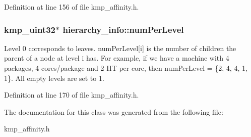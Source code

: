 Definition at line 156 of file kmp\-\_\-affinity.\-h.

\hypertarget{classhierarchy__info_a12fc455d853883d91e3a19567aaac3fe}{
\subsubsection[{num\-Per\-Level}]{\setlength{\rightskip}{0pt plus 5cm}kmp\-\_\-uint32$\ast$ hierarchy\-\_\-info\-::num\-Per\-Level}}\label{classhierarchy__info_a12fc455d853883d91e3a19567aaac3fe}
Level 0 corresponds to leaves. num\-Per\-Level\mbox{[}i\mbox{]} is the number of children the parent of a node at level i has. For example, if we have a machine with 4 packages, 4 cores/package and 2 H\-T per core, then num\-Per\-Level = \{2, 4, 4, 1, 1\}. All empty levels are set to 1. 

Definition at line 170 of file kmp\-\_\-affinity.\-h.



The documentation for this class was generated from the following file\-:\begin{DoxyCompactItemize}
\item 
kmp\-\_\-affinity.\-h\end{DoxyCompactItemize}
